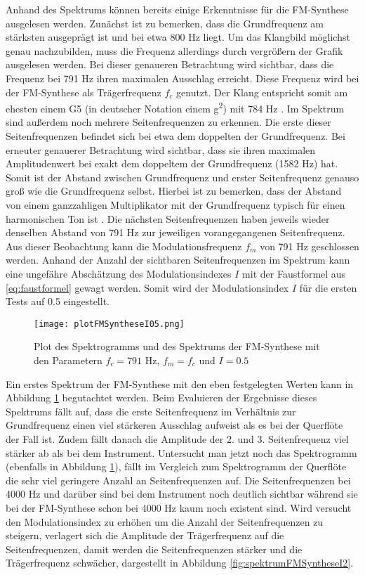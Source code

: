 Anhand des Spektrums können bereits einige Erkenntnisse für die FM-Synthese ausgelesen werden. Zunächst ist zu bemerken, dass die Grundfrequenz am stärksten ausgeprägt ist und bei etwa 800 Hz liegt. Um das Klangbild möglichst genau nachzubilden, muss die Frequenz allerdings durch vergrößern der Grafik ausgelesen werden. Bei dieser genaueren Betrachtung wird sichtbar, dass die Frequenz bei 791 Hz ihren maximalen Ausschlag erreicht. Diese Frequenz wird bei der FM-Synthese als Trägerfrequenz $f_c$ genutzt. Der Klang entspricht somit am ehesten einem G5 (in deutscher Notation einem g\textsuperscript{2}) mit 784 Hz \cite[S. 181]{borucki}. Im Spektrum sind außerdem noch mehrere Seitenfrequenzen zu erkennen. Die erste dieser Seitenfrequenzen befindet sich bei etwa dem doppelten der Grundfrequenz. Bei erneuter genauerer Betrachtung wird sichtbar, dass sie ihren maximalen Amplitudenwert bei exakt dem doppeltem der Grundfrequenz (1582 Hz) hat. Somit ist der Abstand zwischen Grundfrequenz und erster Seitenfrequenz genauso groß wie die Grundfrequenz selbst. Hierbei ist zu bemerken, dass der Abstand von einem ganzzahligen Multiplikator mit der Grundfrequenz typisch für einen harmonischen Ton ist \cite[S. 528]{chowningPaper}. Die nächsten Seitenfrequenzen haben jeweils wieder denselben Abstand von 791 Hz zur jeweiligen vorangegangenen Seitenfrequenz. Aus dieser Beobachtung kann die Modulationsfrequenz $f_m$ von 791 Hz geschlossen werden. Anhand der Anzahl der sichtbaren Seitenfrequenzen im Spektrum kann eine ungefähre Abschätzung des Modulationsindexes $I$ mit der Faustformel aus \ref{eq:faustformel} gewagt werden. Somit wird der Modulationsindex $I$ für die ersten Tests auf 0.5 eingestellt. 

\begin{figure} [ht]
\centering
  \texttt{[image: plotFMSyntheseI05.png]}
\caption{Plot des Spektrogramms und des Spektrums der FM-Synthese mit den Parametern $f_c = 791$ Hz, $f_m = f_c$ und $I = 0.5$ }
\label{fig:plotFMSyntheseI05}
\end{figure}

Ein erstes Spektrum der FM-Synthese mit den eben festgelegten Werten kann in Abbildung \ref{fig:plotFMSyntheseI05} begutachtet werden. Beim Evaluieren der Ergebnisse dieses Spektrums fällt auf, dass die erste Seitenfrequenz im Verhältnis zur Grundfrequenz einen viel stärkeren Ausschlag aufweist als es bei der Querflöte der Fall ist. Zudem fällt danach die Amplitude der 2. und 3. Seitenfrequenz viel stärker ab als bei dem Instrument. Untersucht man jetzt noch das Spektrogramm (ebenfalls in Abbildung \ref{fig:plotFMSyntheseI05}), fällt im Vergleich zum Spektrogramm der Querflöte die sehr viel geringere Anzahl an Seitenfrequenzen auf. Die Seitenfrequenzen bei 4000 Hz und darüber sind bei dem Instrument noch deutlich sichtbar während sie bei der FM-Synthese schon bei 4000 Hz kaum noch existent sind. Wird versucht den Modulationsindex zu erhöhen um die Anzahl der Seitenfrequenzen zu steigern, verlagert sich die Amplitude der Trägerfrequenz auf die Seitenfrequenzen, damit werden die Seitenfrequenzen stärker und die Trägerfrequenz schwächer, dargestellt in Abbildung \ref{fig:spektrumFMSyntheseI2}. 

